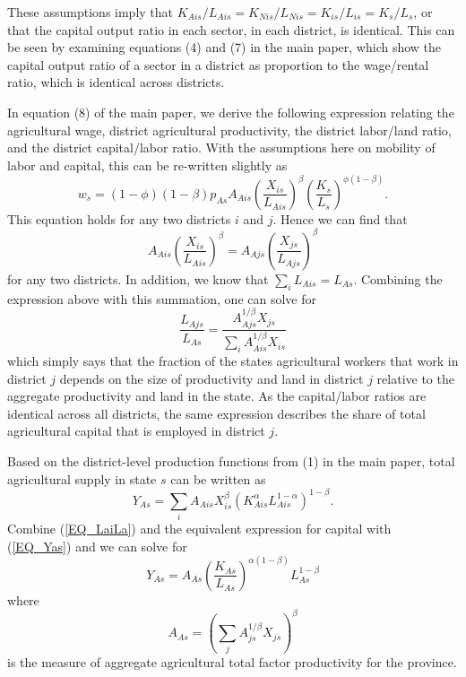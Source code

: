 \documentclass[11pt]{article}
\begin{document}
These assumptions imply that $K_{Ais}/L_{Ais} = K_{Nis}/L_{Nis} = K_{is}/L_{is} = K_s/L_s$, or that the capital output ratio in each sector, in each district, is identical. This can be seen by examining equations (4) and (7) in the main paper, which show the capital output ratio of a sector in a district as proportion to the wage/rental ratio, which is identical across districts.

In equation (8) of the main paper, we derive the following expression relating the agricultural wage, district agricultural productivity, the district labor/land ratio, and the district capital/labor ratio. With the assumptions here on mobility of labor and capital, this can be re-written slightly as
\begin{equation}
    w_{s} = (1-\phi)(1-\beta) p_{As} A_{Ais} \left(\frac{X_{is}}{L_{Ais}}\right)^{\beta} \left(\frac{K_{s}}{L_{s}}\right)^{\phi(1-\beta)}.
\end{equation}
This equation holds for any two districts $i$ and $j$. Hence we can find that
\begin{equation}
    A_{Ais} \left(\frac{X_{is}}{L_{Ais}}\right)^{\beta} = A_{Ajs} \left(\frac{X_{js}}{L_{Ajs}}\right)^{\beta}
\end{equation}
for any two districts. In addition, we know that $\sum_i L_{Ais} = L_{As}$. Combining the expression above with this summation, one can solve for
\begin{equation}
    \frac{L_{Ajs}}{L_{As}} = \frac{A_{Ajs}^{1/\beta} X_{js}}{\sum_i A_{Ais}^{1/\beta} X_{is}} \label{EQ_LaiLa}
\end{equation}
which simply says that the fraction of the states agricultural workers that work in district $j$ depends on the size of productivity and land in district $j$ relative to the aggregate productivity and land in the state. As the capital/labor ratios are identical across all districts, the same expression describes the share of total agricultural capital that is employed in district $j$.

Based on the district-level production functions from (1) in the main paper, total agricultural supply in state $s$ can be written as
\begin{equation}
Y_{As} = \sum_{i} A_{Ais} X_{is}^{\beta} \left(K_{Ais}^{\alpha}L_{Ais}^{1-\alpha}\right)^{1-\beta}. \label{EQ_Yas}
\end{equation}
Combine (\ref{EQ_LaiLa}) and the equivalent expression for capital with (\ref{EQ_Yas}) and we can solve for
\begin{equation}
    Y_{As} = A_{As} \left(\frac{K_{As}}{L_{As}}\right)^{\alpha(1-\beta)} L_{As}^{1-\beta} \label{EQ_YA}
\end{equation}
where 
\begin{equation}
    A_{As} = \left(\sum_{j} A_{js}^{1/\beta}X_{js} \right)^\beta \nonumber
\end{equation}
is the measure of aggregate agricultural total factor productivity for the province.
\end{document}
